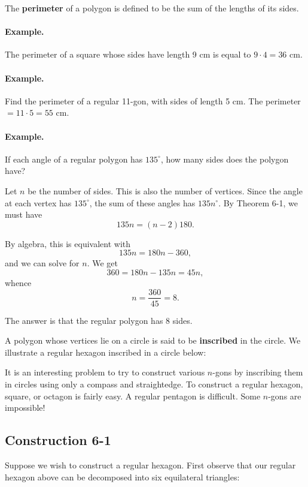 \documentclass[12pt]{book} %
\begin{document}
The \textbf{perimeter} of a polygon is defined to be the sum of the lengths of its sides.

\paragraph{Example.}
The perimeter of a square whose sides have length 9 cm is equal to $9\cdot 4=36$ cm.

\paragraph{Example.}
Find the perimeter of a regular 11-gon, with sides of length 5 cm. The perimeter $=11\cdot 5=55$ cm.

\paragraph{Example.}
If each angle of a regular polygon has $135^\circ$, how many sides does the polygon have?

Let $n$ be the number of sides. This is also the number of vertices. Since the angle at each vertex has $135^\circ$, the sum of these angles has $135n^\circ$. By Theorem 6-1, we must have
\[
135n=(n-2)180.
\]

By algebra, this is equivalent with
\[
135n=180n-360,
\]
and we can solve for $n$. We get
\[
360=180n-135n=45n,
\]
whence
\[
n=\frac{360}{45}=8.
\]

The answer is that the regular polygon has 8 sides.

A polygon whose vertices lie on a circle is said to be \textbf{inscribed} in the circle. We illustrate a regular hexagon inscribed in a circle below:


It is an interesting problem to try to construct various $n$-gons by inscribing them in circles using only a compass and straightedge. To construct a regular hexagon, square, or octagon is fairly easy. A regular pentagon is difficult. Some $n$-gons are impossible!

\subsection*{Construction 6-1}

Suppose we wish to construct a regular hexagon. First observe that our regular hexagon above can be decomposed into six equilateral triangles:

\end{document}
